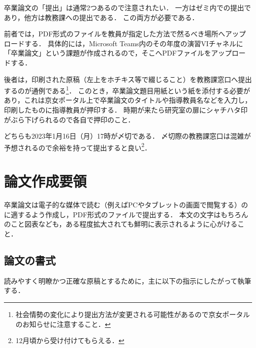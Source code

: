 \documentclass[a4paper,twocolumn,10pt]{ltjsarticle}
\begin{document}
卒業論文の「提出」は通常2つあるので注意されたい．
一方はゼミ内での提出であり，他方は教務課への提出である．
この両方が必要である．

前者では，PDF形式のファイルを教員が指定した方法で然るべき場所へアップロードする．
具体的には，Microsoft Teams内のその年度の演習VIチャネルに「卒業論文」という課題が作成されるので，そこへPDFファイルをアップロードする．

後者は，印刷された原稿（左上をホチキス等で綴じること）を教務課窓口へ提出するのが通例である\footnote{社会情勢の変化により提出方法が変更される可能性があるので京女ポータルのお知らせに注意すること．}．
このとき，卒業論文題目用紙という紙を添付する必要があり，これは京女ポータル上で卒業論文のタイトルや指導教員名などを入力し，印刷したものに指導教員が押印する．
時期が来たら研究室の扉にシャチハタ印がぶら下げられるので各自で押印のこと．

どちらも2023年1月16日（月）17時が〆切である．
〆切際の教務課窓口は混雑が予想されるので余裕を持って提出すると良い\footnote{12月頃から受け付けてもらえる．}．

\section{論文作成要領}

卒業論文は電子的な媒体で読む（例えばPCやタブレットの画面で閲覧する）のに適するよう作成し，PDF形式のファイルで提出する．
本文の文字はもちろんのこと図表なども，ある程度拡大されても鮮明に表示されるように心がけること．

\subsection{論文の書式}

読みやすく明瞭かつ正確な原稿とするために，主に以下の指示にしたがって執筆する．
\end{document}
